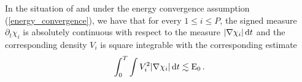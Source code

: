 \begin{proposition}
	\label{existence_and_square_integrability_of_velocities_multiphase}
	In the situation of  and under the energy convergence assumption (\ref{energy_convergence}), we have that for every $ 1 \leq i \leq P $, the signed measure $ \partial_{ t } \chi_{ i } $ is absolutely continuous with respect to the measure $ \abs{ \nabla \chi_{i } } \dd{ t } $ and the corresponding density $ V_{ i } $ is square integrable with the corresponding estimate
	\begin{equation}
		\label{velocity_l2_estimate}
		\int_{ 0 }^{ T }
			\int
				V_{ i }^{ 2 }
			\abs{ \nabla \chi_{ i } }
		\dd{ t }
		\lesssim
		\operatorname{E}_{ 0 }.
	\end{equation}
\end{proposition}

